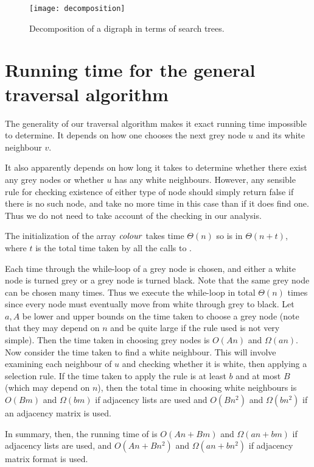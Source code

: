 \begin{figure}[htbp]
  \centering
  \texttt{[image: decomposition]}
  \caption{Decomposition of a digraph in terms of search trees.}
  \label{fig:travdecomp}
\end{figure}

\section{Running time for the general traversal algorithm}

The generality
of our traversal algorithm makes it exact running time impossible to determine.  It depends on how one chooses the next grey node $u$
and its white neighbour $v$. 

It also apparently depends on how long it
takes to determine whether there exist any grey nodes or whether $u$ has
any white neighbours. However, any sensible rule for checking existence
of either type of node should simply return false if there is no such
node, and take no more time in this case than if it does find one. Thus
we do not need to take account of the checking in our analysis.

The initialization of the array $\operatorname{\text{\textit{colour}}}$ takes time 
$\Theta(n)$ so  
is in $\Theta(n + t)$, where $t$ is the total time taken by all 
the calls to .

Each time through the while-loop of  a grey node is
chosen, and either a white node is turned grey or a grey node is turned
black. Note that the same grey node can be chosen many times. Thus
we execute the while-loop in total $\Theta(n)$ times since every node
must eventually move from white through grey to black. Let $a, A$ be
lower and upper bounds on the time taken to choose a grey node (note
that they may depend on $n$ and be quite large if the rule used is not
very simple). Then the time taken in choosing grey nodes is $O(An)$ and
$\Omega(an)$. Now consider the time taken to find a white neighbour. This
will involve examining each  neighbour of $u$ and checking whether it is
white, then applying a selection rule. If the time taken to apply the rule
is at least $b$ and at most $B$ (which may depend on $n$), then the total 
time in
choosing white neighbours is $O(Bm)$ and $\Omega(bm)$ if adjacency lists
are used and $O(Bn^2)$ and $\Omega(bn^2)$ if an adjacency matrix is used.

In summary, then, the running time of  is $O(An + Bm)$
and $\Omega(an + bm)$ if adjacency lists are used, and $O(An + Bn^2)$
and $\Omega(an + bn^2)$ if adjacency matrix format is used.

